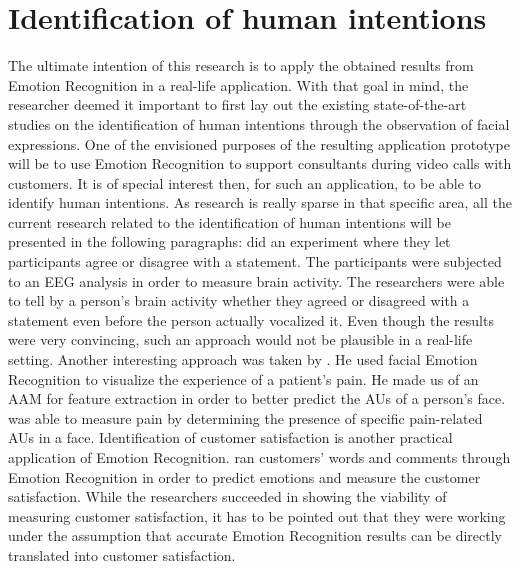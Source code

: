 \section{Identification of human intentions}
The ultimate intention of this research is to apply the obtained results from Emotion Recognition in a real-life application. With that goal in mind, the researcher deemed it important to first lay out the existing state-of-the-art studies on the identification of human intentions through the observation of facial expressions. One of the envisioned purposes of the resulting application prototype will be to use Emotion Recognition to support consultants during video calls with customers.
\newline\newline
It is of special interest then, for such an application, to be able to identify human intentions. As research is really sparse in that specific area, all the current research related to the identification of human intentions will be presented in the following paragraphs:
\newline\newline
\citet{Dong:2012:UnderstandHumanImplicitIntention} did an experiment where they let participants agree or disagree with a statement. The participants were subjected to an \gls{EEG} analysis in order to measure brain activity. The researchers were able to tell by a person’s brain activity whether they agreed or disagreed with a statement even before the person actually vocalized it. Even though the results were very convincing, such an approach would not  be plausible in a real-life setting.
\newline\newline
Another interesting approach was taken by \citet{Esser:2018:LandmarkDetection}. He used facial Emotion Recognition to visualize the experience of a patient's pain. He made us of an \gls{AAM} for feature extraction in order to better predict the AUs of a person's face. \citeauthor{Esser:2018:LandmarkDetection} was able to measure pain by determining the presence of specific pain-related AUs in a face.
\newline\newline
Identification of customer satisfaction is another practical application of Emotion Recognition. \citet{Ren:2012:ERforCustomerSatisfaction} ran customers' words and comments through Emotion Recognition in order to predict emotions and measure the customer satisfaction. While the researchers succeeded in showing the viability of measuring customer satisfaction, it has to be pointed out that they were working under the assumption that accurate Emotion Recognition results can be directly translated into customer satisfaction.
